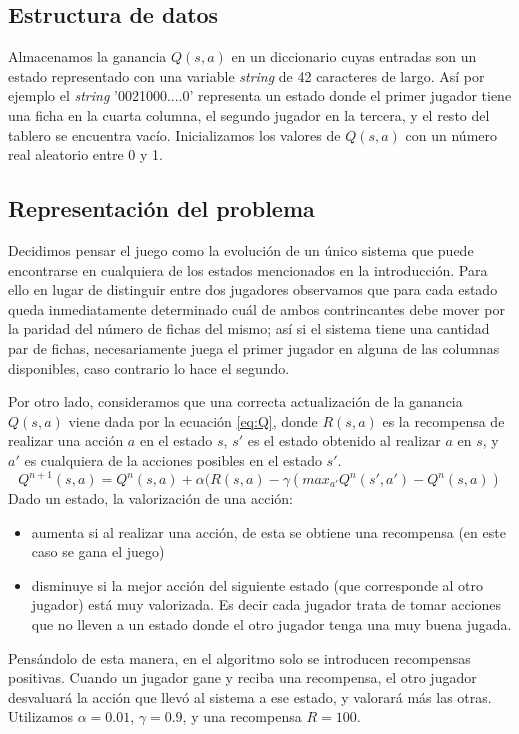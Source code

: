\documentclass[11pt, spanish]{article}
\begin{document}
\subsection{Estructura de datos}

\par Almacenamos la ganancia $Q(s,a)$ en un diccionario cuyas entradas son un 
estado representado con una variable \emph{string} de 42 caracteres de largo. 
Así por ejemplo el \emph{string} '0021000....0' representa un estado donde 
el primer jugador tiene una ficha en la cuarta columna, el segundo jugador en 
la tercera, y el resto del tablero se encuentra vacío. Inicializamos los valores 
de $Q(s,a)$ con un número real aleatorio entre 0 y 1.

\subsection{Representación del problema}

\par Decidimos pensar el juego como la evolución de un único sistema que puede 
encontrarse en cualquiera de los estados mencionados en la introducción. Para 
ello en lugar de distinguir entre dos jugadores observamos que para cada estado 
queda inmediatamente determinado cuál de ambos contrincantes debe mover por la 
paridad del número de fichas del mismo; así si el sistema tiene una cantidad par 
de fichas, necesariamente juega el primer jugador en alguna de las columnas 
disponibles, caso contrario lo hace el segundo.
\par Por otro lado, consideramos que una correcta actualización de la ganancia 
$Q(s,a)$ viene dada por la ecuación \ref{eq:Q}, donde $R(s,a)$ es la recompensa 
de realizar una acción $a$ en el estado $s$, $s'$ es el estado obtenido al 
realizar $a$ en $s$, y $a'$ es cualquiera de la acciones posibles en el estado 
$s'$.
\begin{equation}
Q^{n+1}(s,a) = Q^{n}(s,a) + \alpha (R(s,a) - \gamma (max_{a'}Q^n(s',a') - Q^n(s,a))
\label{eq:Q}
\end{equation} 
Dado un estado, la valorización de una acción:
\begin{itemize}
\item aumenta si al realizar una acción, de esta se obtiene una recompensa (en este caso se gana el juego)
\item disminuye si la mejor acción del siguiente estado (que corresponde al otro jugador) está muy valorizada. Es decir cada jugador trata de tomar acciones que no lleven a un estado donde el otro jugador tenga una muy buena jugada.
\end{itemize}
Pensándolo de esta manera, en el algoritmo solo se introducen recompensas 
positivas. Cuando un jugador gane y reciba una recompensa, el otro jugador 
desvaluará la acción que llevó al sistema a ese estado, y valorará más las 
otras. Utilizamos $\alpha = 0.01$, $\gamma = 0.9$, y una recompensa $R = 100$.
\end{document}
